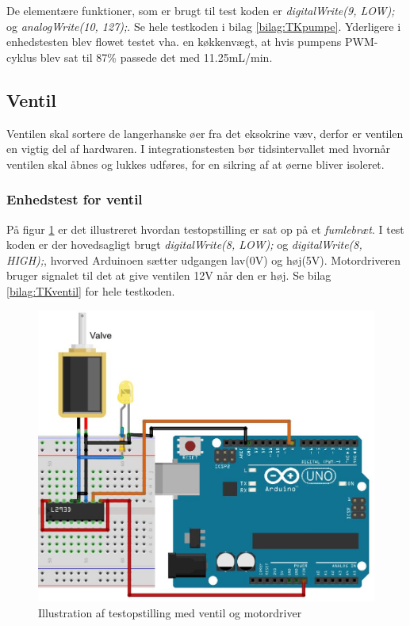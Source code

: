 De elementære funktioner, som er brugt til test koden er \textit{digitalWrite(9, LOW);} og \textit{analogWrite(10, 127);}. Se hele testkoden i bilag \ref{bilag:TKpumpe}. Yderligere i enhedstesten blev flowet testet vha. en køkkenvægt, at hvis pumpens PWM-cyklus blev sat til 87\% passede det med 11.25mL/min.

\newpage

 \subsection{Ventil}
Ventilen skal sortere de langerhanske øer fra det eksokrine væv, derfor er ventilen en vigtig del af hardwaren. I integrationstesten bør tidsintervallet med hvornår ventilen skal åbnes og lukkes udføres, for en sikring af at øerne bliver isoleret.
\subsubsection{Enhedstest for ventil}
På figur \ref{fig:ventilbreadboard} er det illustreret hvordan testopstilling er sat op på et \textit{fumlebræt}. I test koden er der hovedsagligt brugt \textit{digitalWrite(8, LOW);} og \textit{digitalWrite(8, HIGH);}, hvorved Arduinoen sætter udgangen lav(0V) og høj(5V). Motordriveren bruger signalet til det at give ventilen 12V når den er høj. Se bilag \ref{bilag:TKventil} for hele testkoden.

\begin{figure}[H]
	\centering
	\includegraphics[width=1\textwidth]{billeder/Hardware/diagrammer/Ventilbreadboard.JPG}
	\caption{Illustration af testopstilling med ventil og motordriver}
	\label{fig:ventilbreadboard}
\end{figure} 
 
